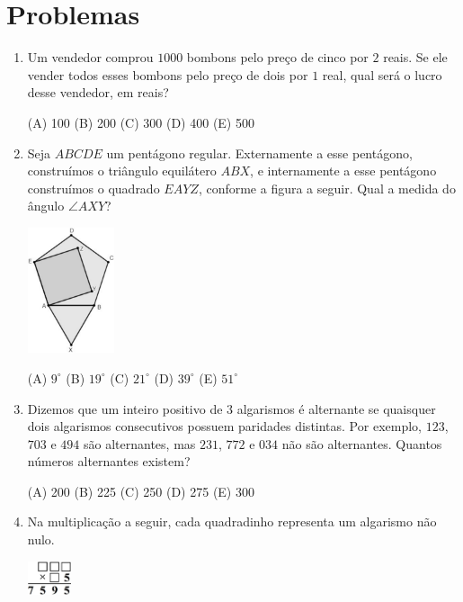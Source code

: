 \documentclass[12pt]{article}
\begin{document}
  \section{\textsf{Problemas}}
    \begin{enumerate}[label=\textbf{{\arabic*.}}]
      \item Um vendedor comprou $1000$ bombons pelo preço de cinco por $2$ reais. Se ele vender todos esses bombons pelo preço de dois por $1$ real, qual será o lucro desse vendedor, em reais?

(A) 100 (B) 200 (C) 300 (D) 400 (E) 500

\item Seja $ABCDE$ um pentágono regular. Externamente a esse pentágono, construímos o triângulo equilátero $ABX$, e internamente a esse pentágono construímos o quadrado $EAYZ$, conforme a figura a seguir. Qual a medida do ângulo $\angle AXY$?

  \begin{center}
    \includegraphics[width=0.2\textwidth]{first.png}
  \end{center}

(A) $9^\circ$ (B) $19^\circ$ (C) $21^\circ$ (D) $39^\circ$ (E) $51^\circ$

\item Dizemos que um inteiro positivo de $3$ algarismos é alternante se quaisquer dois algarismos consecutivos possuem paridades distintas. Por exemplo, $123$, $703$ e $494$ são alternantes, mas $231$, $772$ e $034$ não são alternantes. Quantos números alternantes existem?

(A) 200 (B) 225 (C) 250 (D) 275 (E) 300

\item Na multiplicação a seguir, cada quadradinho representa um algarismo não nulo.

    \begin{center}
    \includegraphics[width=0.1\textwidth]{second.png}
  \end{center}



\end{enumerate}
\end{document}
